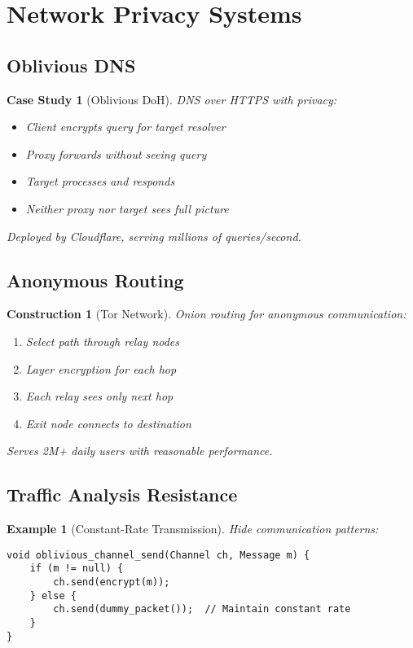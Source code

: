 \documentclass[11pt,final,hidelinks]{article}
\newtheorem{example}[theorem]{Example}
\newtheorem{construction}[theorem]{Construction}
\newtheorem{casestudy}[theorem]{Case Study}
\begin{document}
\section{Network Privacy Systems}

\subsection{Oblivious DNS}

\begin{casestudy}[Oblivious DoH]
DNS over HTTPS with privacy:
\begin{itemize}
    \item Client encrypts query for target resolver
    \item Proxy forwards without seeing query
    \item Target processes and responds
    \item Neither proxy nor target sees full picture
\end{itemize}
Deployed by Cloudflare, serving millions of queries/second.
\end{casestudy}

\subsection{Anonymous Routing}

\begin{construction}[Tor Network]
Onion routing for anonymous communication:
\begin{enumerate}
    \item Select path through relay nodes
    \item Layer encryption for each hop
    \item Each relay sees only next hop
    \item Exit node connects to destination
\end{enumerate}
Serves 2M+ daily users with reasonable performance.
\end{construction}

\subsection{Traffic Analysis Resistance}

\begin{example}[Constant-Rate Transmission]
Hide communication patterns:
\begin{verbatim}
void oblivious_channel_send(Channel ch, Message m) {
    if (m != null) {
        ch.send(encrypt(m));
    } else {
        ch.send(dummy_packet());  // Maintain constant rate
    }
}
\end{verbatim}
\end{example}
\end{document}
